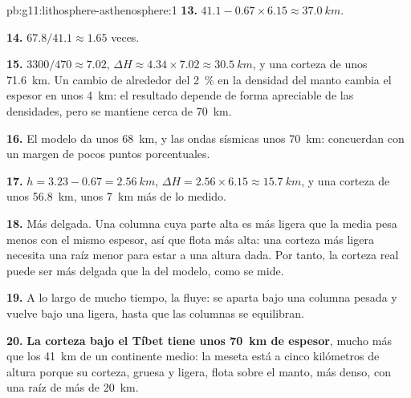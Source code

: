 \begin{solution}{pb:g11:lithosphere-asthenosphere:1}
\textbf{13.} $41.1 - 0.67 \times 6.15 \approx \qty{37.0}{km}$.

\textbf{14.} $67.8/41.1 \approx 1.65$ veces.

\textbf{15.} $3300/470 \approx 7.02$, $\Delta H \approx 4.34 \times 7.02
\approx \qty{30.5}{km}$, y una corteza de unos \qty{71.6}{km}. Un cambio de
alrededor del \qty{2}{\percent} en la densidad del manto cambia el espesor en
unos \qty{4}{km}: el resultado depende de forma apreciable de las densidades,
pero se mantiene cerca de \qty{70}{km}.

\textbf{16.} El modelo da unos \qty{68}{km}, y las ondas sísmicas unos
\qty{70}{km}: concuerdan con un margen de pocos puntos porcentuales.

\textbf{17.} $h = 3.23 - 0.67 = \qty{2.56}{km}$, $\Delta H = 2.56 \times
6.15 \approx \qty{15.7}{km}$, y una corteza de unos \qty{56.8}{km}, unos
\qty{7}{km} más de lo medido.

\textbf{18.} Más delgada. Una columna cuya parte alta es más ligera que la
media pesa menos con el mismo espesor, así que flota más alta: una corteza
más ligera necesita una raíz menor para estar a una altura dada. Por tanto,
la corteza real puede ser más delgada que la del modelo, como se mide.

\textbf{19.} A lo largo de mucho tiempo, la  fluye: se aparta bajo
una columna pesada y vuelve bajo una ligera, hasta que las columnas se
equilibran.

\textbf{20.} \textbf{La corteza bajo el Tíbet tiene unos \qty{70}{km} de
espesor}, mucho más que los \qty{41}{km} de un continente medio: la meseta
está a cinco kilómetros de altura porque su corteza, gruesa y ligera, flota
sobre el manto, más denso, con una raíz de más de \qty{20}{km}.
\end{solution}
